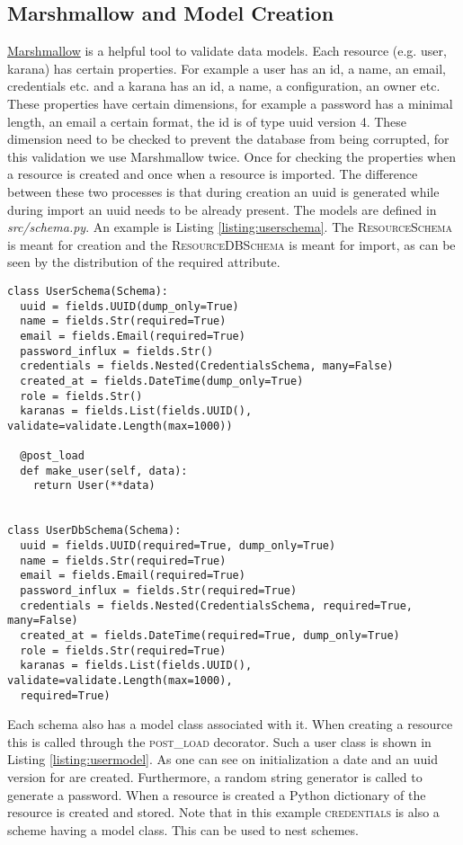 \subsection{Marshmallow and Model Creation  }\label{subsection:marshmallow}
\href{http://marshmallow.readthedocs.io/en/latest/}{Marshmallow} is a helpful tool to validate data models. Each resource (e.g. user, karana) has certain properties. For example a user has an id, a name, an email, credentials etc. and a karana has an id, a name, a configuration, an owner etc. These properties have certain dimensions, for example a password has a minimal length, an email a certain format, the id is of type uuid version 4. These dimension need to be checked to prevent the database from being corrupted, for this validation we use Marshmallow twice. Once for  checking the properties when a resource is created and once when a resource is imported. The difference between these two processes is that during creation an uuid is generated while during import an uuid needs to be already present. 
The models are defined in \textit{src/schema.py}. An example is Listing \ref{listing:userschema}. The \textsc{ResourceSchema} is meant for creation and the \textsc{ResourceDBSchema} is meant for import, as can be seen by the distribution of the required attribute. 
\begin{lstlisting}[caption={Example for a marshmallow scheme, here user},label={listing:userschema}]
class UserSchema(Schema):
  uuid = fields.UUID(dump_only=True)
  name = fields.Str(required=True)
  email = fields.Email(required=True)
  password_influx = fields.Str()
  credentials = fields.Nested(CredentialsSchema, many=False)
  created_at = fields.DateTime(dump_only=True)
  role = fields.Str()
  karanas = fields.List(fields.UUID(), validate=validate.Length(max=1000))

  @post_load
  def make_user(self, data):
    return User(**data)


class UserDbSchema(Schema):
  uuid = fields.UUID(required=True, dump_only=True)
  name = fields.Str(required=True)
  email = fields.Email(required=True)
  password_influx = fields.Str(required=True)
  credentials = fields.Nested(CredentialsSchema, required=True, many=False)
  created_at = fields.DateTime(required=True, dump_only=True)  
  role = fields.Str(required=True)  
  karanas = fields.List(fields.UUID(), validate=validate.Length(max=1000),
  required=True)  
\end{lstlisting}
Each schema also has a model class associated with it. When creating a resource this is called through the \textsc{post\_load} decorator. Such a user class is shown in Listing \ref{listing:usermodel}. As one can see on initialization a date and an uuid version for are created. Furthermore, a random string generator is called to generate a password. When a resource is created a Python dictionary of the resource is created and stored. Note that in this example \textsc{credentials} is also a scheme having a model class. This can be used to nest schemes.
